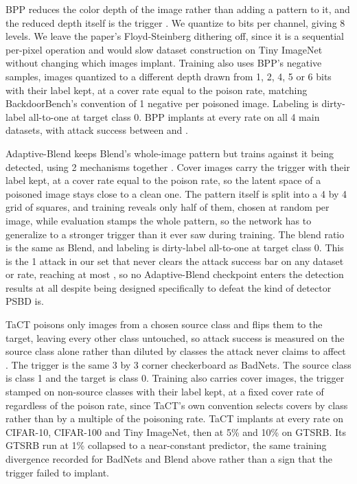 

BPP reduces the color depth of the image rather than adding a pattern to it, and the reduced depth itself is the trigger \cite{wang2022bpp}. We quantize to \AttackBppBitDepth{} bits per channel, giving 8 levels. We leave the paper's Floyd-Steinberg dithering off, since it is a sequential per-pixel operation and would slow dataset construction on Tiny ImageNet without changing which images implant. Training also uses BPP's negative samples, images quantized to a different depth drawn from 1, 2, 4, 5 or 6 bits with their label kept, at a cover rate equal to the poison rate, matching BackdoorBench's convention of 1 negative per poisoned image. Labeling is dirty-label all-to-one at target class 0. BPP implants at every rate on all 4 main datasets, with attack success between \AttackBppAsrMin{} and \AttackBppAsrMax{}.

Adaptive-Blend keeps Blend's whole-image pattern but trains against it being detected, using 2 mechanisms together \cite{qi2023adaptive}. Cover images carry the trigger with their label kept, at a cover rate equal to the poison rate, so the latent space of a poisoned image stays close to a clean one. The pattern itself is split into a 4 by 4 grid of squares, and training reveals only half of them, chosen at random per image, while evaluation stamps the whole pattern, so the network has to generalize to a stronger trigger than it ever saw during training. The blend ratio is the same \AttackAdaptiveBlendAlpha{} as Blend, and labeling is dirty-label all-to-one at target class 0. This is the 1 attack in our set that never clears the attack success bar on any dataset or rate, reaching at most \AttackAdaptiveBlendAsrMax{}, so no Adaptive-Blend checkpoint enters the detection results at all despite being designed specifically to defeat the kind of detector PSBD is.

TaCT poisons only images from a chosen source class and flips them to the target, leaving every other class untouched, so attack success is measured on the source class alone rather than diluted by classes the attack never claims to affect \cite{tang2021demon}. The trigger is the same 3 by 3 corner checkerboard as BadNets. The source class is class 1 and the target is class 0. Training also carries cover images, the trigger stamped on non-source classes with their label kept, at a fixed cover rate of \AttackTactCoverRate{} regardless of the poison rate, since TaCT's own convention selects covers by class rather than by a multiple of the poisoning rate. TaCT implants at every rate on CIFAR-10, CIFAR-100 and Tiny ImageNet, then at 5\% and 10\% on GTSRB. Its GTSRB run at 1\% collapsed to a near-constant predictor, the same training divergence recorded for BadNets and Blend above rather than a sign that the trigger failed to implant.

